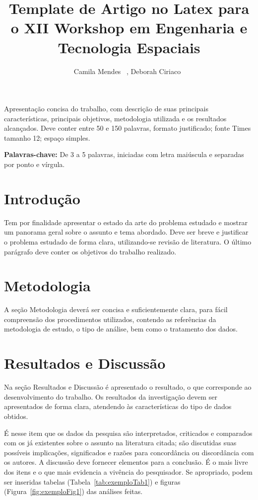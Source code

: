 \documentclass[12pt]{article}
\title{Template de Artigo no Latex para o XII Workshop em Engenharia e Tecnologia Espaciais}
\author{Camila Mendes ~\inst{1}, Deborah Ciriaco~\inst{2}}
\begin{document}
\maketitle

\begin{resumo}
Apresentação concisa do trabalho, com descrição de suas principais características, principais objetivos, metodologia utilizada e os resultados alcançados. Deve conter entre 50 e 150 palavras, formato justificado; fonte Times tamanho 12; espaço simples.
\end{resumo}
\hrulefill

\begin{flushleft}
\textbf{Palavras-chave:} De 3 a 5 palavras, iniciadas com letra maiúscula e separadas por ponto e vírgula.
\end{flushleft}

\section{Introdução}

Tem por finalidade apresentar o estado da arte do problema estudado e mostrar um panorama geral sobre o assunto e tema abordado. Deve ser breve e justificar o problema estudado de forma clara, utilizando-se revisão de literatura. O último parágrafo deve conter os objetivos do trabalho realizado.

\section{Metodologia} \label{sec:met}

A seção Metodologia deverá ser concisa e suficientemente clara, para fácil compreensão dos procedimentos utilizados, contendo as referências da metodologia de estudo, o tipo de análise, bem como o tratamento dos dados.

\section{Resultados e Discussão}

Na seção Resultados e Discussão é apresentado o resultado, o que corresponde ao desenvolvimento do trabalho. Os resultados da investigação devem ser apresentados de forma clara, atendendo às características do tipo de dados obtidos. 

É nesse item que os dados da pesquisa são interpretados, criticados e comparados com os já existentes sobre o assunto na literatura citada; são discutidas suas possíveis implicações, significados e razões para concordância ou discordância com os autores. A discussão deve fornecer elementos para a conclusão. É o mais livre dos itens e o que mais evidencia a vivência do pesquisador. Se apropriado, podem ser inseridas tabelas 
(Tabela~\ref{tab:exemploTab1}) e figuras (Figura~\ref{fig:exemploFig1}) das análises feitas.
\end{document}
